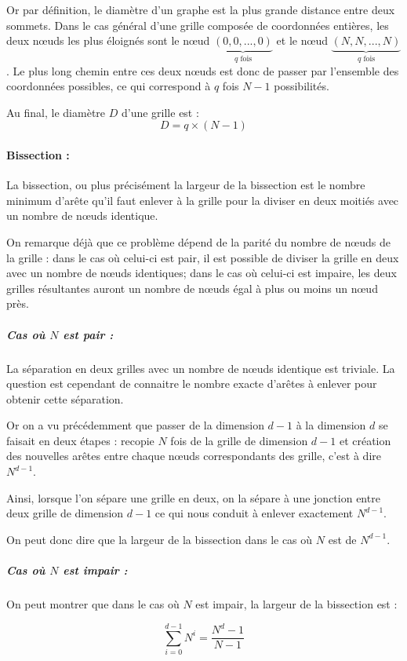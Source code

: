 Or par définition, le diamètre d'un graphe est la plus grande distance entre deux sommets. Dans le cas général d'une grille composée de coordonnées entières, les deux nœuds les plus éloignés sont le nœud $\underbrace{(0,0,...,0)}_{q \text{ fois}}$ et le nœud $\underbrace{(N,N,...,N)}_{q \text{ fois}}$. Le plus long chemin entre ces deux nœuds est donc de passer par l'ensemble des coordonnées possibles, ce qui correspond à $q$ fois $N-1$ possibilités.

Au final, le diamètre $D$ d'une grille est : $$D = q\times(N-1)$$

\paragraph{Bissection :}

La bissection, ou plus précisément la largeur de la bissection est le nombre minimum d'arête qu'il faut enlever à la grille pour la diviser en deux moitiés avec un nombre de nœuds identique.

On remarque déjà que ce problème dépend de la parité du nombre de nœuds de la grille : dans le cas où celui-ci est pair, il est possible de diviser la grille en deux avec un nombre de nœuds identiques; dans le cas où celui-ci est impaire, les deux grilles résultantes auront un nombre de nœuds égal à plus ou moins un nœud près.

\subparagraph{Cas où $N$ est pair :}

La séparation en deux grilles avec un nombre de nœuds identique est triviale. La question est cependant de connaitre le nombre exacte d'arêtes à enlever pour obtenir cette séparation.

Or on a vu précédemment que passer de la dimension $d-1$ à la dimension $d$ se faisait en deux étapes : recopie $N$ fois de la grille de dimension $d-1$ et création des nouvelles arêtes entre chaque nœuds correspondants des grille, c'est à dire $N^{d-1}$.

Ainsi, lorsque l'on sépare une grille en deux, on la sépare à une jonction entre deux grille de dimension $d-1$ ce qui nous conduit à enlever exactement $N^{d-1}$.

On peut donc dire que la largeur de la bissection dans le cas où $N$ est de $N^{d-1}$.

\subparagraph{Cas où $N$ est impair :}

On peut montrer que dans le cas où $N$ est impair, la largeur de la bissection est :

$$\sum_{i=0}^{d-1} N^i = \frac{N^d-1}{N-1}$$